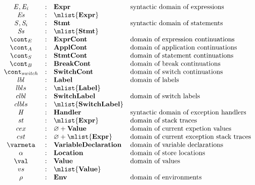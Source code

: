 \documentclass[a4paper,oneside]{article}
\renewcommand{\emptyset}{\varnothing}
\begin{document}
\newcommand{\dclass}{\mathbf{Class}}
\newcommand{\dformals}{\mathbf{Formals}}
\[
  \begin{array}{ccll}
    \expr, \expri{i}
    & : & \dexpr & \text{syntactic domain of expressions}\\
    \exprs
    & : & \mlist{\dexpr}\\

    \stmt, \stmti{i}
    & : & \dstmt & \text{syntactic domain of statements}\\
    \stmts
    & : & \mlist{\dstmt}  & \text{}\\

    \econt
    & : & \decont & \text{domain of expression continuations}\\
    \acont
    & : & \dacont & \text{domain of application continuations}\\
    \scont
    & : & \dscont & \text{domain of statement continuations}\\
    \bcont
    & : & \dbcont & \text{domain of break continuations}\\
    \switchcont
    & : & \dswitchcont & \text{domain of switch continuations}\\

    \lbl & : & \dlbl & \text{domain of labels}\\
    \lbls & : & \mlist{\dlbl} \\
    \clbl & : & \dclbl & \text{domain of switch labels}\\
    \clbls & : & \mlist{\dclbl} \\

    \handler
    & : & \dhandler & \text{syntactic domain of exception handlers} \\
    \strace
    & : & \mlist{\dexpr} & \text{domain of stack traces}\\
    \cex
    & : &  \emptyset + \dval & \text{domain of current expetion values}\\
    \cstrace
    & : & \emptyset + \mlist{\dexpr} & \text{domain of current exception stack traces}\\

    \varmeta
    & : & \dvardecl & \text{domain of variable declarations}\\
    \loc
    & : & \dlocation & \text{domain of store locations}\\
    \val
    & : & \dval & \text{domain of values}\\
    \vals
    & : & \mlist{\dval}\\
    \env
    & : & \denv & \text{domain of environments}\\
  \end{array}
\]
\end{document}
